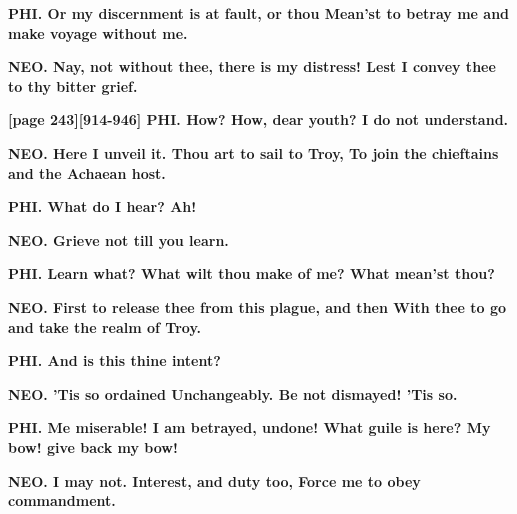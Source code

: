 \documentclass[11pt,letter]{book}
\begin{document}
\par \textbf{PHI. Or my discernment is at fault, or thou Mean’st to betray me and make voyage without me.}
\par 

\par \textbf{NEO. Nay, not without thee, there is my distress! Lest I convey thee to thy bitter grief.}
\par 

\par \textbf{[page 243][914-946] PHI. How? How, dear youth? I do not understand.}
\par 

\par \textbf{NEO. Here I unveil it. Thou art to sail to Troy, To join the chieftains and the Achaean host.}
\par 

\par \textbf{PHI. What do I hear? Ah!}
\par 

\par \textbf{NEO. Grieve not till you learn.}
\par 

\par \textbf{PHI. Learn what? What wilt thou make of me? What mean’st thou?}
\par 

\par \textbf{NEO. First to release thee from this plague, and then With thee to go and take the realm of Troy.}
\par 

\par \textbf{PHI. And is this thine intent?}
\par 

\par \textbf{NEO. ’Tis so ordained Unchangeably. Be not dismayed! ’Tis so.}
\par 

\par \textbf{PHI. Me miserable! I am betrayed, undone! What guile is here? My bow! give back my bow!}
\par 

\par \textbf{NEO. I may not. Interest, and duty too, Force me to obey commandment.}
\par 
\end{document}
